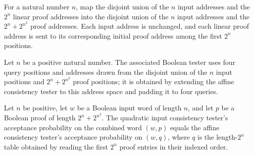 \begin{definition}
\label{FABL.quadraticInputConsistencyAddress}
\leanok
{}
For a natural number $n$, map the disjoint union of the $n$ input addresses and the
$2^n$ linear proof addresses into the disjoint union of the $n$ input addresses and the
$2^n+2^{n^2}$ proof addresses. Each input address is unchanged, and each linear proof
address is sent to its corresponding initial proof address among the first $2^n$
positions.
\end{definition}

\begin{definition}
\label{FABL.quadraticInputConsistencyFunctionTester}
\leanok
{}
Let $n$ be a positive natural number. The associated Boolean tester uses four query
positions and addresses drawn from the disjoint union of the $n$ input positions and
$2^n+2^{n^2}$ proof positions; it is obtained by extending the affine consistency tester
to this address space and padding it to four queries.
\end{definition}

\begin{theorem}
\label{FABL.quadraticInputConsistencyFunctionTester_acceptanceProbability}
\leanok
{}
Let $n$ be positive, let $w$ be a Boolean input word of length $n$, and let $p$ be a
Boolean proof of length $2^n+2^{n^2}$. The quadratic input consistency tester's
acceptance probability on the combined word $(w,p)$ equals the affine consistency
tester's acceptance probability on $(w,q)$, where $q$ is the length-$2^n$ table obtained
by reading the first $2^n$ proof entries in their indexed order.
\end{theorem}

